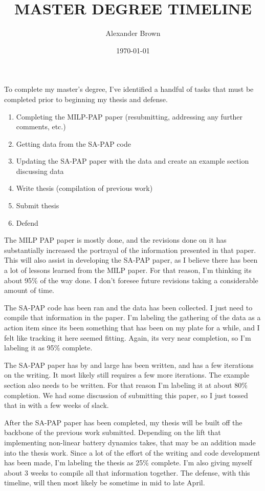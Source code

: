 \documentclass[11pt,a4paper,final]{article}
\author{Alexander Brown}
\date{\today}
\title{MASTER DEGREE TIMELINE}
\begin{document}
\maketitle
To complete my master's degree, I've identified a handful of tasks that must be completed prior to beginning my thesis and defense.

\begin{enumerate}
\item Completing the MILP-PAP paper (resubmitting, addressing any further comments, etc.)
\item Getting data from the SA-PAP code
\item Updating the SA-PAP paper with the data and create an example section discussing data
\item Write thesis (compilation of previous work)
\item Submit thesis
\item Defend
\end{enumerate}


The MILP PAP paper is mostly done, and the revisions done on it has substantially increased the portrayal of the information presented in that paper. This will also assist in developing the SA-PAP paper, as I believe there has been a lot of lessons learned from the MILP paper. For that reason, I'm thinking its about 95\% of the way done. I don't foresee future revisions taking a considerable amount of time.

The SA-PAP code has been ran and the data has been collected. I just need to compile that information in the paper. I'm labeling the gathering of the data as a action item since its been something that has been on my plate for a while, and I felt like tracking it here seemed fitting. Again, its very near completion, so I'm labeling it as 95\% complete.

The SA-PAP paper has by and large has been written, and has a few iterations on the writing. It most likely still requires a few more iterations. The example section also needs to be written. For that reason I'm labeling it at about 80\% completion. We had some discussion of submitting this paper, so I just tossed that in with a few weeks of slack.

After the SA-PAP paper has been completed, my thesis will be built off the backbone of the previous work submitted. Depending on the lift that implementing non-linear battery dynamics takes, that may be an addition made into the thesis work. Since a lot of the effort of the writing and code development has been made, I'm labeling the thesis as 25\% complete. I'm also giving myself about 3 weeks to compile all that information together. The defense, with this timeline, will then most likely be sometime in mid to late April.
\end{document}
